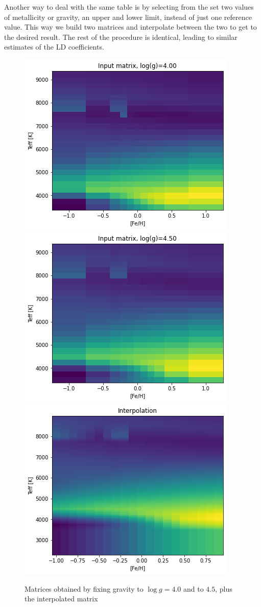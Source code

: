 \documentclass[a4paper,11pt,twocolumn]{article}
\begin{document}
\medskip

Another way to deal with the same table is by selecting from the set two values
of metallicity or gravity, an upper and lower limit, instead of just one reference 
value. This way we build two matrices and 
interpolate between the two to get to the desired result. The rest of the 
procedure is identical, leading to similar estimates of the LD coefficients.
\begin{figure}[H]
    \centering  
    \includegraphics[scale=0.35, angle=0]{../pictures/Claret2017/double_logg4}
    \includegraphics[scale=0.35, angle=0]{../pictures/Claret2017/double_logg45}
    \includegraphics[scale=0.35, angle=0]{../pictures/Claret2017/double_logg_interp}
    \caption{Matrices obtained by fixing gravity to $\log{g}=4.0$ and to $4.5$, plus the interpolated matrix}
\end{figure}
\end{document}
